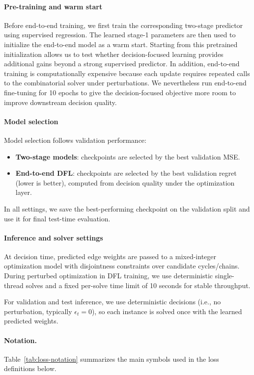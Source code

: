 \documentclass{article}
\begin{document}
\paragraph{Pre-training and warm start}
Before end-to-end training, we first train the corresponding two-stage predictor using supervised regression. The learned stage-1 parameters are then used to initialize the end-to-end model as a warm start. Starting from this pretrained initialization allows us to test whether decision-focused learning provides additional gains beyond a strong supervised predictor. In addition, end-to-end training is computationally expensive because each update requires repeated calls to the combinatorial solver under perturbations. We nevertheless run end-to-end fine-tuning for 10 epochs to give the decision-focused objective more room to improve downstream decision quality.

\paragraph{Model selection}
Model selection follows validation performance:
\begin{itemize}
    \item \textbf{Two-stage models}: checkpoints are selected by the best validation MSE.
    \item \textbf{End-to-end DFL}: checkpoints are selected by the best validation regret (lower is better), computed from decision quality under the optimization layer.
\end{itemize}
In all settings, we save the best-performing checkpoint on the validation split and use it for final test-time evaluation.

\paragraph{Inference and solver settings}
At decision time, predicted edge weights are passed to a mixed-integer optimization model with disjointness constraints over candidate cycles/chains. During perturbed optimization in DFL training, we use deterministic single-thread solves and a fixed per-solve time limit of 10 seconds for stable throughput.

For validation and test inference, we use deterministic decisions (i.e., no perturbation, typically $\epsilon_t=0$), so each instance is solved once with the learned predicted weights.

\paragraph{Notation.}
Table~\ref{tab:loss-notation} summarizes the main symbols used in the loss definitions below.
\end{document}
